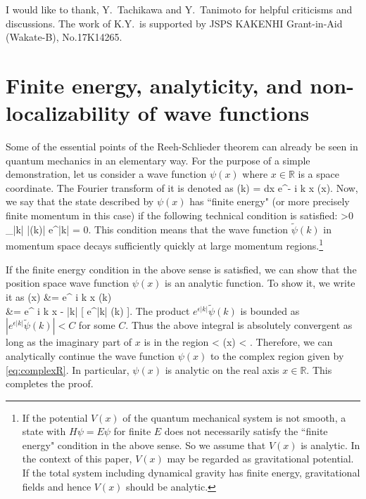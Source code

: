 \documentclass[12pt,a4paper]{article}
\theoremstyle{plain}
\theoremstyle{definition}
\numberwithin{thm}{section}
\def\Im{\mathop{\mathrm{Im}}}
\def\BR{{\mathbb R}}
\def\beq#1\eeq{\begin{align}#1\end{align}}
\begin{document}
\acknowledgments
I would like to thank, Y.~Tachikawa and Y.~Tanimoto for helpful criticisms and discussions.
The work of K.Y.~is supported by JSPS KAKENHI Grant-in-Aid (Wakate-B), No.17K14265.


\appendix

\section{Finite energy, analyticity, and non-localizability of wave functions}\label{app:wave}
Some of the essential points of the Reeh-Schlieder theorem can already be seen in quantum mechanics in an elementary way.
For the purpose of a simple demonstration, let us consider a wave function $\psi(x)$ where $x \in \BR$ is a space coordinate.
The Fourier transform of it is denoted as
\beq
\widetilde{\psi}(k) = \int dx e^{- i k x} \psi(x).
\eeq
Now, we say that the state described by $\psi(x)$ has ``finite energy" (or more precisely finite momentum in this case) 
if the following technical condition is satisfied:
\beq
\exists \epsilon >0  \lim_{|k| \to \infty} |\widetilde{\psi}(k)| e^{\epsilon |k|} = 0.
\eeq
This condition means that the wave function $\widetilde{\psi}(k)$ in momentum space decays sufficiently quickly at large momentum regions.\footnote{
If the potential $V(x)$ of the quantum mechanical system is not smooth, a state with $H \psi = E \psi$ for finite $E$ does not necessarily satisfy
the ``finite energy" condition in the above sense. So we assume that $V(x)$ is analytic.
In the context of this paper, $V(x)$ may be regarded as gravitational potential. If the total system including dynamical gravity has finite energy,
gravitational fields and hence $V(x)$ should be analytic.
}


If the finite energy condition in the above sense is satisfied, we can show that the position space wave function $\psi(x)$ is an analytic function.
To show it, we write it as
\beq
\psi(x) &= \int {} e^{ i k x} \widetilde{\psi}(k) \nonumber \\
&= \int {} e^{ i k x - \epsilon |k|} [ e^{\epsilon |k|} \widetilde{\psi}(k) ].
\eeq
The product $e^{\epsilon |k|} \widetilde{\psi}(k)$ is bounded as $|e^{\epsilon |k|} \widetilde{\psi}(k) | <C$ for some $C$.
Thus the above integral is absolutely convergent as long as the imaginary part of $x$ is in the region
\beq
 - \epsilon < \Im (x) < \epsilon. \label{eq:complexR}
\eeq
Therefore, we can analytically continue the wave function $\psi(x)$ to the complex region given by \eqref{eq:complexR}.
In particular, $\psi(x)$ is analytic on the real axis $x \in \BR$. This completes the proof.
\end{document}
